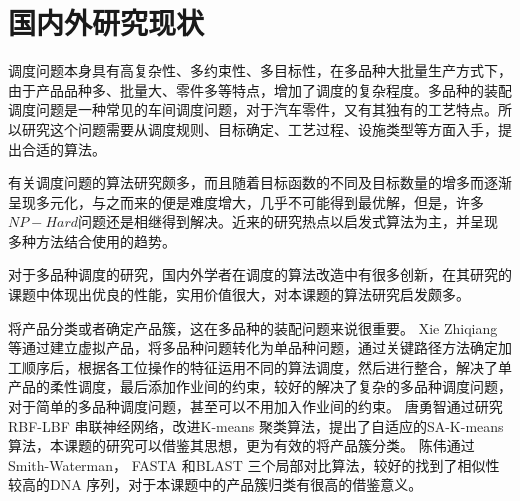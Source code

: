 \section{国内外研究现状}
调度问题本身具有高复杂性、多约束性、多目标性，在多品种大批量生产方式下，由于产品品种多、批量大、零件多等特点，增加了调度的复杂程度。多品种的装配调度问题是一种常见的车间调度问题，对于汽车零件，又有其独有的工艺特点。所以研究这个问题需要从调度规则、目标确定、工艺过程、设施类型等方面入手，提出合适的算法。

有关调度问题的算法研究颇多，而且随着目标函数的不同及目标数量的增多而逐渐呈现多元化，与之而来的便是难度增大，几乎不可能得到最优解，但是，许多$NP - Hard$问题还是相继得到解决。近来的研究热点以启发式算法为主，并呈现多种方法结合使用的趋势。

对于多品种调度的研究，国内外学者在调度的算法改造中有很多创新，在其研究的课题中体现出优良的性能，实用价值很大，对本课题的算法研究启发颇多。

将产品分类或者确定产品簇，这在多品种的装配问题来说很重要。
Xie Zhiqiang\cite{xie2010study} 等通过建立虚拟产品，将多品种问题转化为单品种问题，通过关键路径方法确定加工顺序后，根据各工位操作的特征运用不同的算法调度，然后进行整合，解决了单产品的柔性调度，最后添加作业间的约束，较好的解决了复杂的多品种调度问题，对于简单的多品种调度问题，甚至可以不用加入作业间的约束。
唐勇智\cite{唐勇智2009基于聚类的}通过研究RBF-LBF 串联神经网络，改进K-means 聚类算法，提出了自适应的SA-K-means 算法，本课题的研究可以借鉴其思想，更为有效的将产品簇分类。
陈伟\cite{陈伟2006生物信息学中的序列相似性比对算法}通过Smith-Waterman， FASTA 和BLAST 三个局部对比算法，较好的找到了相似性较高的DNA 序列，对于本课题中的产品簇归类有很高的借鉴意义。


